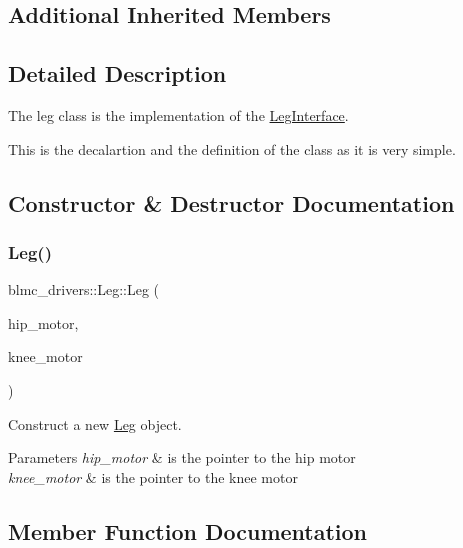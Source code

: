\subsection*{Additional Inherited Members}


\subsection{Detailed Description}
The leg class is the implementation of the \hyperlink{classblmc__drivers_1_1LegInterface}{Leg\+Interface}. 

This is the decalartion and the definition of the class as it is very simple. 

\subsection{Constructor \& Destructor Documentation}
\mbox{\label{classblmc__drivers_1_1Leg_aaa53f0583fcfd7f4e8aa32889aaa2f85}} 
\subsubsection{\texorpdfstring{Leg()}{Leg()}}
{\footnotesize\ttfamily blmc\+\_\+drivers\+::\+Leg\+::\+Leg (\begin{DoxyParamCaption}\item[{std\+::shared\+\_\+ptr$<$ \hyperlink{classblmc__drivers_1_1MotorInterface}{Motor\+Interface} $>$}]{hip\+\_\+motor,  }\item[{std\+::shared\+\_\+ptr$<$ \hyperlink{classblmc__drivers_1_1MotorInterface}{Motor\+Interface} $>$}]{knee\+\_\+motor }\end{DoxyParamCaption})\hspace{0.3cm}{\ttfamily [inline]}}



Construct a new \hyperlink{classblmc__drivers_1_1Leg}{Leg} object. 


\begin{DoxyParams}{Parameters}
{\em hip\+\_\+motor} & is the pointer to the hip motor \\
\hline
{\em knee\+\_\+motor} & is the pointer to the knee motor \\
\hline
\end{DoxyParams}


\subsection{Member Function Documentation}
\mbox{\label{classblmc__drivers_1_1Leg_aeeb8a84e6dd1f1809d220ee1da8d3007}} 
